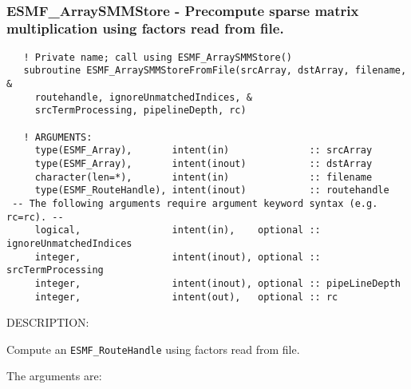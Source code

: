  
\mbox{}\hrulefill\ 
 
\subsubsection [ESMF\_ArraySMMStore] {ESMF\_ArraySMMStore - Precompute sparse matrix multiplication using factors read from file.}


  
\begin{verbatim}   ! Private name; call using ESMF_ArraySMMStore()
   subroutine ESMF_ArraySMMStoreFromFile(srcArray, dstArray, filename, &
     routehandle, ignoreUnmatchedIndices, &
     srcTermProcessing, pipelineDepth, rc)
 
   ! ARGUMENTS:
     type(ESMF_Array),       intent(in)              :: srcArray
     type(ESMF_Array),       intent(inout)           :: dstArray
     character(len=*),       intent(in)              :: filename
     type(ESMF_RouteHandle), intent(inout)           :: routehandle
 -- The following arguments require argument keyword syntax (e.g. rc=rc). --
     logical,                intent(in),    optional :: ignoreUnmatchedIndices
     integer,                intent(inout), optional :: srcTermProcessing
     integer,                intent(inout), optional :: pipeLineDepth
     integer,                intent(out),   optional :: rc\end{verbatim}
{\sf DESCRIPTION:\\ }


  
   Compute an {\tt ESMF\_RouteHandle} using factors read from file.
  
   The arguments are:
  
